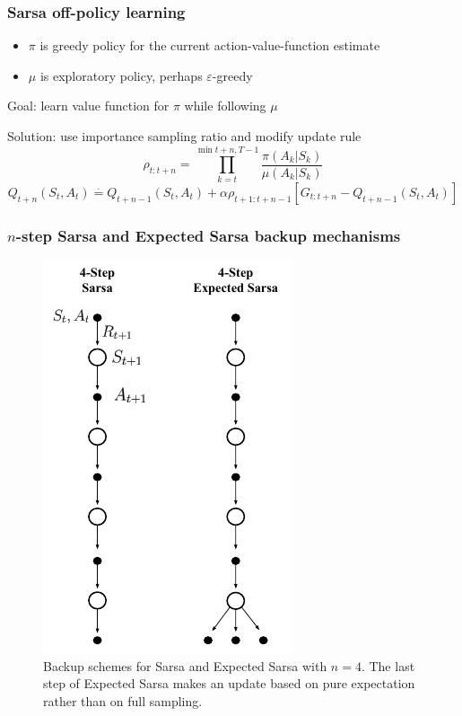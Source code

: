 \documentclass{beamer}
\begin{document}
\begin{frame}
  \frametitle{Sarsa off-policy learning}
  \begin{itemize}
    \item $\pi$ is greedy policy for the current action-value-function estimate
    \item $\mu$ is exploratory policy, perhaps $\varepsilon$-greedy
  \end{itemize}
  Goal: learn value function for $\pi$ while following $\mu$

  Solution: use importance sampling ratio and modify update rule
  $$\rho_{t : t + n} = \prod_{k = t}^{\min{t + n, T - 1}}
    \frac{\pi(A_k | S_k)}{\mu(A_k | S_k)}$$
  $$Q_{t + n}(S_t, A_t) \overset{\cdot}{=} Q_{t + n - 1}(S_t, A_t) +
    \alpha \rho_{t + 1 : t + n - 1} [G_{t : t + n} - Q_{t + n - 1}(S_t, A_t)]$$
\end{frame}

\begin{frame}
  \frametitle{$n$-step Sarsa and Expected Sarsa backup mechanisms}
  \begin{figure}
    \centering
    \includegraphics[height=0.6 \textheight]{sarsa_backup}
    \caption{Backup schemes for Sarsa and Expected Sarsa with $n = 4$. The last
      step of Expected Sarsa makes an update based on pure expectation rather
      than on full sampling.}
  \end{figure}
\end{frame}
\end{document}

